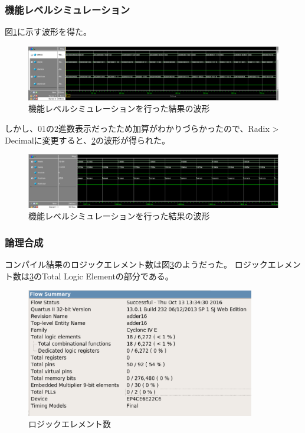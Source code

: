 \documentclass[uplatex]{jsarticle}
\begin{document}
\subsubsection{機能レベルシミュレーション}

図\ref{fig:06}に示す波形を得た。

\begin{figure}[htb]
  \begin{center}
    \includegraphics[width=13cm]{images/fig06.eps}
    \caption{機能レベルシミュレーションを行った結果の波形}
    \label{fig:06}
  \end{center}
\end{figure}

しかし、01の2進数表示だったため加算がわかりづらかったので、Radix > Decimalに変更すると、\ref{fig:06-1}の波形が得られた。

\begin{figure}[htb]
  \begin{center}
    \includegraphics[width=13cm]{images/fig06-1.eps}
    \caption{機能レベルシミュレーションを行った結果の波形}
    \label{fig:06-1}
  \end{center}
\end{figure}

\subsubsection{論理合成}

コンパイル結果のロジックエレメント数は図\ref{fig:07}のようだった。
ロジックエレメント数は\ref{fig:07}のTotal Logic Elementの部分である。  

\begin{figure}[htb]
  \begin{center}
    \includegraphics[width=10cm]{images/fig07.eps}
    \caption{ロジックエレメント数}
    \label{fig:07}
  \end{center}
\end{figure}
\end{document}
